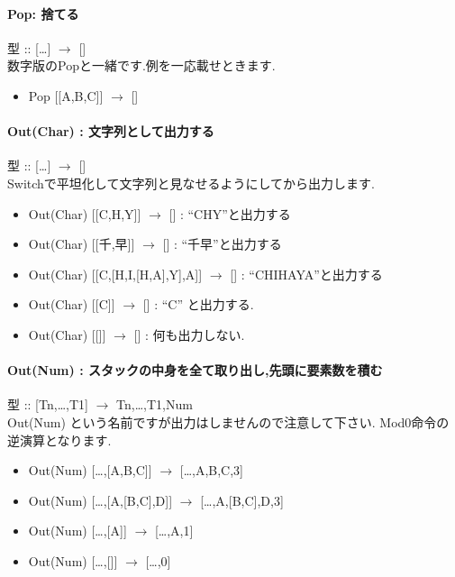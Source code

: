 \paragraph{Pop: 捨てる}

型 :: {[}\ldots{}{]} $\to$
{[}{]}\\数字版のPopと一緒です.例を一応載せときます.

\begin{itemize}
\item
  Pop {[}{[}A,B,C{]}{]} $\to$ {[}{]}
\end{itemize}

\paragraph{Out(Char) : 文字列として出力する}

型 :: {[}\ldots{}{]} $\to$ {[}{]}\\
Switchで平坦化して文字列と見なせるようにしてから出力します.

\begin{itemize}
\item
  Out(Char) {[}{[}C,H,Y{]}{]} $\to$ {[}{]} : ``CHY''と出力する
\item
  Out(Char) {[}{[}千,早{]}{]} $\to$ {[}{]} :
  ``千早''と出力する
\item
  Out(Char) {[}{[}C,{[}H,I,{[}H,A{]},Y{]},A{]}{]} $\to$ {[}{]}
  : ``CHIHAYA''と出力する
\item
  Out(Char) {[}{[}C{]}{]} $\to$ {[}{]} : ``C'' と出力する.
\item
  Out(Char) {[}{[}{]}{]} $\to$ {[}{]} : 何も出力しない.
\end{itemize}

\paragraph{Out(Num) : スタックの中身を全て取り出し,先頭に要素数を積む}

型 :: {[}Tn,\ldots{},T1{]} $\to$ Tn,\ldots{},T1,Num\\Out(Num)
という名前ですが出力はしませんので注意して下さい.
Mod0命令の逆演算となります.

\begin{itemize}
\item
  Out(Num) {[}\ldots{},{[}A,B,C{]}{]} $\to$
  {[}\ldots{},A,B,C,3{]}
\item
  Out(Num) {[}\ldots{},{[}A,{[}B,C{]},D{]}{]} $\to$
  {[}\ldots{},A,{[}B,C{]},D,3{]}
\item
  Out(Num) {[}\ldots{},{[}A{]}{]} $\to$ {[}\ldots{},A,1{]}
\item
  Out(Num) {[}\ldots{},{[}{]}{]} $\to$ {[}\ldots{},0{]}
\end{itemize}

